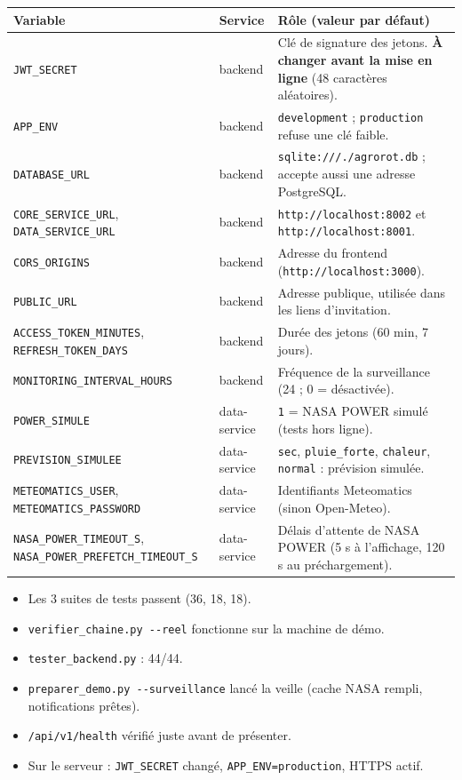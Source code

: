 \documentclass[11pt,a4paper]{article}
\begin{document}
\begin{center}
\small
\begin{longtable}{L{5.2cm}L{1.9cm}L{7.8cm}}
\toprule
\textbf{Variable} & \textbf{Service} & \textbf{Rôle (valeur par défaut)} \\
\midrule
\endhead
\texttt{JWT\_SECRET} & backend & Clé de signature des jetons. \textbf{À changer avant la mise en ligne} (48 caractères aléatoires). \\
\texttt{APP\_ENV} & backend & \texttt{development} ; \texttt{production} refuse une clé faible. \\
\texttt{DATABASE\_URL} & backend & \texttt{sqlite:///./agrorot.db} ; accepte aussi une adresse PostgreSQL. \\
\texttt{CORE\_SERVICE\_URL}, \texttt{DATA\_SERVICE\_URL} & backend & \texttt{http://localhost:8002} et \texttt{http://localhost:8001}. \\
\texttt{CORS\_ORIGINS} & backend & Adresse du frontend (\texttt{http://localhost:3000}). \\
\texttt{PUBLIC\_URL} & backend & Adresse publique, utilisée dans les liens d'invitation. \\
\texttt{ACCESS\_TOKEN\_MINUTES}, \texttt{REFRESH\_TOKEN\_DAYS} & backend & Durée des jetons (60 min, 7 jours). \\
\texttt{MONITORING\_INTERVAL\_HOURS} & backend & Fréquence de la surveillance (24 ; 0 = désactivée). \\
\texttt{POWER\_SIMULE} & data-service & \texttt{1} = NASA POWER simulé (tests hors ligne). \\
\texttt{PREVISION\_SIMULEE} & data-service & \texttt{sec}, \texttt{pluie\_forte}, \texttt{chaleur}, \texttt{normal} : prévision simulée. \\
\texttt{METEOMATICS\_USER}, \texttt{METEOMATICS\_PASSWORD} & data-service & Identifiants Meteomatics (sinon Open-Meteo). \\
\texttt{NASA\_POWER\_TIMEOUT\_S}, \texttt{NASA\_POWER\_PREFETCH\_TIMEOUT\_S} & data-service & Délais d'attente de NASA POWER (5 s à l'affichage, 120 s au préchargement). \\
\bottomrule
\end{longtable}
\end{center}

\begin{idee}
\begin{itemize}
\item[\sym{☐}] Les 3 suites de tests passent (36, 18, 18).
\item[\sym{☐}] \texttt{verifier\_chaine.py -{}-reel} fonctionne sur la machine de démo.
\item[\sym{☐}] \texttt{tester\_backend.py} : 44/44.
\item[\sym{☐}] \texttt{preparer\_demo.py -{}-surveillance} lancé la veille (cache NASA rempli, notifications prêtes).
\item[\sym{☐}] \texttt{/api/v1/health} vérifié juste avant de présenter.
\item[\sym{☐}] Sur le serveur : \texttt{JWT\_SECRET} changé, \texttt{APP\_ENV=production}, HTTPS actif.
\end{itemize}
\end{idee}
\end{document}
